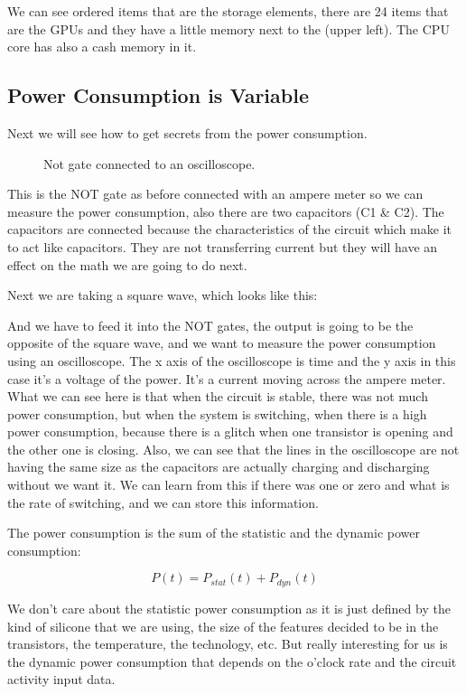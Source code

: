 We can see ordered items that are the storage elements, there are 24 items that
are the GPUs and they have a little memory next to the (upper left). The CPU
core has also a cash memory in it.

\subsection { Power Consumption is Variable }

Next we will see how to get secrets from the power consumption.

\begin{figure}[!ht]
    \centering
    
    \caption{Not gate connected to an oscilloscope.} \label{fig:Not gate connected to an oscilloscope}
\end{figure}

This is the NOT gate as before connected with an ampere meter so we can measure
the power consumption, also there are two capacitors (C1 \& C2). The capacitors
are connected because the characteristics of the circuit which make it to act
like capacitors. They are not transferring current but they will have an effect
on the math we are going to do next.

Next we are taking a square wave, which looks like this:

And we have to feed it into the NOT gates, the output is going to be the
opposite of the square wave, and we want to measure the power consumption using
an oscilloscope. The x axis of the oscilloscope is time and the y axis in this
case it's a voltage of the power. It's a current moving across the ampere meter.
What we can see here is that when the circuit is stable, there was not much
power consumption, but when the system is switching, when there is a high power
consumption, because there is a glitch when one transistor is opening and the
other one is closing. Also, we can see that the lines in the oscilloscope are
not having the same size as the capacitors are actually charging and discharging
without we want it. We can learn from this if there was one or zero and what is
the rate of switching, and we can store this information.

The power consumption is the sum of the statistic and the dynamic power
consumption: 

\begin{displaymath}
    P(t)=P_{stat}(t) + P_{dyn}(t)
\end{displaymath}

We don't care about the statistic power consumption as it is just defined by the
kind of silicone that we are using, the size of the features decided to be in
the transistors, the temperature, the technology, etc. But really interesting
for us is the dynamic power consumption that depends on the o'clock rate and the
circuit activity input data.

